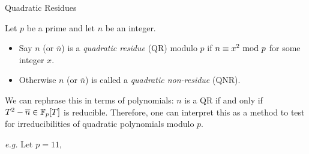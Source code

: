 
\begin{center}
{\Large Quadratic Residues}
\end{center}

\begin{definition}
Let $p$ be a prime and let $n$ be an integer.
\begin{itemize}
\item Say $n$ (or $\overline{n}$) is a \emph{quadratic residue} (QR) modulo $p$ if $n\equiv x^2\text{ mod }{p}$ for some integer $x$.
\item Otherwise $n$ (or $\overline{n}$) is called a \emph{quadratic non-residue} (QNR).
\end{itemize}
We can rephrase this in terms of polynomials: $n$ is a QR if and only if $T^2 - \overline{n} \in \mathbb F_p[T]$ is reducible. Therefore, one can interpret this as a method to test for irreducibilities of quadratic polynomials modulo $p$.
\end{definition}
\emph{e.g.} Let $p = 11$,
